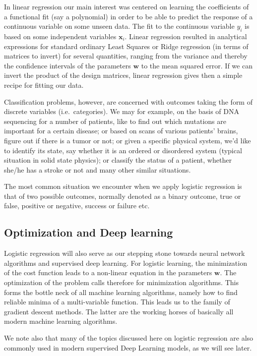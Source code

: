 \documentclass[%
oneside,                 %
final,                   %
10pt]{article}
\begin{document}
In linear regression our main interest was centered on learning the
coefficients of a functional fit (say a polynomial) in order to be
able to predict the response of a continuous variable on some unseen
data. The fit to the continuous variable $y_i$ is based on some
independent variables $\boldsymbol{x}_i$. Linear regression resulted in
analytical expressions for standard ordinary Least Squares or Ridge
regression (in terms of matrices to invert) for several quantities,
ranging from the variance and thereby the confidence intervals of the
parameters $\boldsymbol{w}$ to the mean squared error. If we can invert
the product of the design matrices, linear regression gives then a
simple recipe for fitting our data.


Classification problems, however, are concerned with outcomes taking
the form of discrete variables (i.e.~categories). We may for example,
on the basis of DNA sequencing for a number of patients, like to find
out which mutations are important for a certain disease; or based on
scans of various patients' brains, figure out if there is a tumor or
not; or given a specific physical system, we'd like to identify its
state, say whether it is an ordered or disordered system (typical
situation in solid state physics); or classify the status of a
patient, whether she/he has a stroke or not and many other similar
situations.

The most common situation we encounter when we apply logistic
regression is that of two possible outcomes, normally denoted as a
binary outcome, true or false, positive or negative, success or
failure etc.

\subsection{Optimization and Deep learning}

Logistic regression will also serve as our stepping stone towards
neural network algorithms and supervised deep learning. For logistic
learning, the minimization of the cost function leads to a non-linear
equation in the parameters $\boldsymbol{w}$. The optimization of the
problem calls therefore for minimization algorithms. This forms the
bottle neck of all machine learning algorithms, namely how to find
reliable minima of a multi-variable function. This leads us to the
family of gradient descent methods. The latter are the working horses
of basically all modern machine learning algorithms.

We note also that many of the topics discussed here on logistic 
regression are also commonly used in modern supervised Deep Learning
models, as we will see later.
\end{document}
